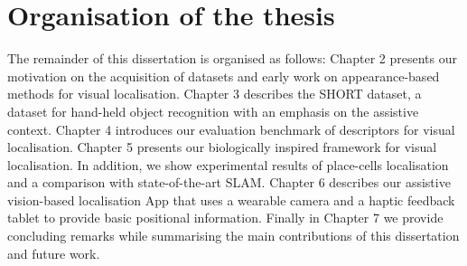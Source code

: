 \section{Organisation of the thesis}

The remainder of this dissertation is organised as follows: Chapter 2 presents our motivation on the acquisition of datasets and early work on appearance-based methods for visual localisation. Chapter 3 describes the SHORT dataset, a dataset for hand-held object recognition with an emphasis on the assistive context. Chapter 4 introduces our evaluation benchmark of descriptors for visual localisation. Chapter 5 presents our biologically inspired framework for visual localisation. In addition, we show experimental results of place-cells localisation  and a comparison with state-of-the-art SLAM. Chapter 6 describes our assistive vision-based localisation App that uses a wearable camera and a haptic feedback tablet to provide basic positional information. Finally in Chapter 7 we provide concluding remarks while summarising the main contributions of this dissertation and future work.


